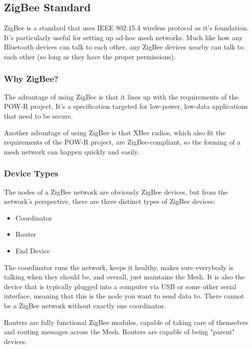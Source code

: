 
\subsection{ZigBee Standard}
ZigBee is a standard that uses \ac{IEEE} 802.15.4 wireless protocol as it's foundation. It's 
particularly useful for setting up ad-hoc mesh networks. Much like how any Bluetooth
devices can talk to each other, any ZigBee devices nearby can talk to each other (so 
long as they have the proper permissions).

\subsubsection{Why ZigBee?}
The advantage of using ZigBee is that it lines up with the requirements of the \ac{POW-R}
project. It's a specification targeted for low-power, low-data applications that need
to be secure. 

Another advantage of using ZigBee is that XBee radios, which also fit the requirements
of the \ac{POW-R} project, are ZigBee-compliant, so the forming of a mesh network can happen
quickly and easily.

\subsubsection{Device Types}
The nodes of a ZigBee network are obviously ZigBee devices, but from the network's
perspective, there are three distinct types of ZigBee devices:

\begin{itemize}
	\item Coordinator
	\item Router
	\item End Device
\end{itemize}

The coordinator runs the network, keeps it healthy, makes sure everybody is talking when
they should be, and overall, just maintains the Mesh. It is also the device that is 
typically plugged into a computer via \ac{USB} or some other serial interface, meaning
that this is the node you want to send data to. There cannot be a ZigBee network
without exactly one coordinator.

Routers are fully functional ZigBee modules, capable of taking care of themselves and
routing messages across the Mesh. Routers are capable of being "parent" devices.


